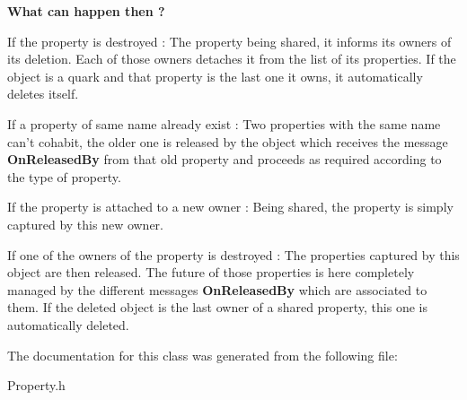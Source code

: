 {\bfseries What can happen then ?}

If the property is destroyed \-: The property being shared, it informs its owners of its deletion. Each of those owners detaches it from the list of its properties. If the object is a quark and that property is the last one it owns, it automatically deletes itself.

If a property of same name already exist \-: Two properties with the same name can't cohabit, the older one is released by the object which receives the message {\bfseries On\-Released\-By} from that old property and proceeds as required according to the type of property.

If the property is attached to a new owner \-: Being shared, the property is simply captured by this new owner.

If one of the owners of the property is destroyed \-: The properties captured by this object are then released. The future of those properties is here completely managed by the different messages {\bfseries On\-Released\-By} which are associated to them. If the deleted object is the last owner of a shared property, this one is automatically deleted. 

The documentation for this class was generated from the following file\-:\begin{DoxyCompactItemize}
\item 
Property.\-h\end{DoxyCompactItemize}
